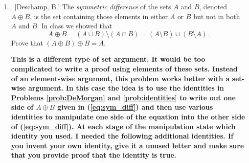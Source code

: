 \documentclass[10pt]{article}
\begin{document}
\begin{enumerate}
\begin{enumerate}
\begin{proof}
\end{proof}
	\item  ~[Wright, A.] $(A \cap B) \cup (A \cap B^c) = A$.
 \begin{proof}
Let A, B, and C be sets.  We must prove equality by double containment.  $(\subseteq)$ Let $x \in (A \cap B) \cup (A \cap B^C).$  Then either $x \in A \cap B$ or $x \in A \cap B^C$.  In either of those two cases, we must have $x \in A$ by definition of intersection.  Therefore, $(A \cap B) \cup (A \cap B^C \subseteq A$.  $(\supseteq)$ Let $x \in A$.  Then either $x \in B$ or $x \in A \cap B^C$.  By definition of union, we therefore have $x \in (A \cap B) \cup (A \cap B^C)$.  Thus, $(A \cap B) \cup (A \cap B^C) \supseteq A$.  Therefore, $(A \cap B) \cup (A \cap B^c) = A$.
 \end{proof}
	
	\end{enumerate}
	
\item\label{prob:sym_diff}  ~[Deschamp, B.] The \emph{symmetric difference} of the sets $A$ and $B$, denoted $A \oplus B$, is the set containing those elements in either $A$ or $B$ but not in both $A$ and $B$.  In class we showed that \begin{equation}\label{eq:sym_diff} A \oplus B = (A \cup B) \setminus (A \cap B) = (A \setminus B) \cup (B \setminus A).\end{equation}  Prove that $(A \oplus B) \oplus B = A$.

\textbf{This is a different type of set argument.  It would be too complicated to write a proof using elements of these sets.  Instead of an element-wise argument, this problem works better with a set-wise argument.  In this case the idea is to use the identities in Problems \ref{prob:DeMorgan} and \ref{prob:identities} to write out one side of $A \oplus B$ given in (\ref{eq:sym_diff}) and then use various identities to manipulate one side of the equation into the other side of (\ref{eq:sym_diff}).  At each stage of the manipulation state which identity you used.  I needed the following additional identities.  If you invent your own identity, give it a unused letter and make sure that you provide proof that the identity is true.}


\end{enumerate}
\end{document}
